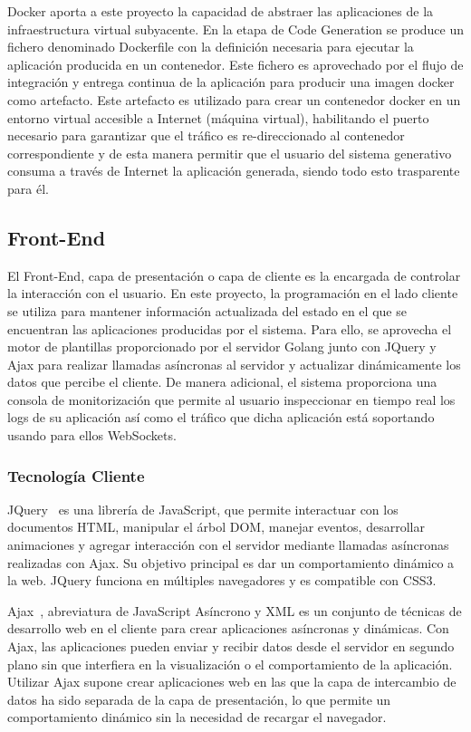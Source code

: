 \documentclass[a4paper,11pt]{book}
\begin{document}
Docker aporta a este proyecto la capacidad de abstraer las aplicaciones de la infraestructura virtual subyacente. En la etapa de Code Generation se produce un fichero denominado Dockerfile con la definición necesaria para ejecutar la aplicación producida en un contenedor. Este fichero es aprovechado  por el flujo de integración y entrega continua de la aplicación  para producir una imagen docker como artefacto. Este artefacto es utilizado para crear un contenedor docker en un entorno virtual accesible a Internet (máquina virtual), habilitando el puerto necesario para garantizar que el tráfico es re-direccionado al contenedor correspondiente y de esta manera permitir que el usuario del sistema generativo consuma a través de Internet la aplicación generada, siendo todo esto trasparente para él. 


\subsection{Front-End}

El Front-End, capa de presentación o capa de cliente es la encargada de controlar la interacción con el usuario. En este proyecto, la programación en el lado cliente se utiliza para mantener  información actualizada del estado en el que se encuentran las aplicaciones producidas por el sistema. Para ello, se aprovecha el motor de plantillas proporcionado por el servidor Golang junto con JQuery y Ajax para realizar llamadas asíncronas al servidor y actualizar dinámicamente los datos que percibe el cliente. De manera adicional, el sistema proporciona una consola de monitorización  que permite al usuario inspeccionar en tiempo real los logs de su aplicación así como el tráfico que dicha aplicación está soportando usando para ellos WebSockets. 

\subsubsection{Tecnología Cliente}


JQuery~\cite{jq} es una librería de JavaScript, que permite interactuar con los documentos HTML, manipular el árbol DOM, manejar eventos, desarrollar animaciones y agregar interacción con el servidor mediante llamadas asíncronas realizadas con Ajax. Su objetivo principal es dar un comportamiento dinámico a la web. JQuery funciona en múltiples navegadores y es compatible con CSS3.

Ajax~\cite{aj}, abreviatura de JavaScript Asíncrono y XML es un conjunto de técnicas de desarrollo web en el cliente para crear aplicaciones asíncronas y dinámicas. Con Ajax, las aplicaciones pueden enviar y recibir datos desde el servidor en segundo plano sin que interfiera en la visualización o el comportamiento de la aplicación. Utilizar Ajax supone crear aplicaciones web en las que la capa de intercambio de datos ha sido separada de la capa de presentación, lo que permite un comportamiento dinámico sin la necesidad de recargar el navegador.
\end{document}
